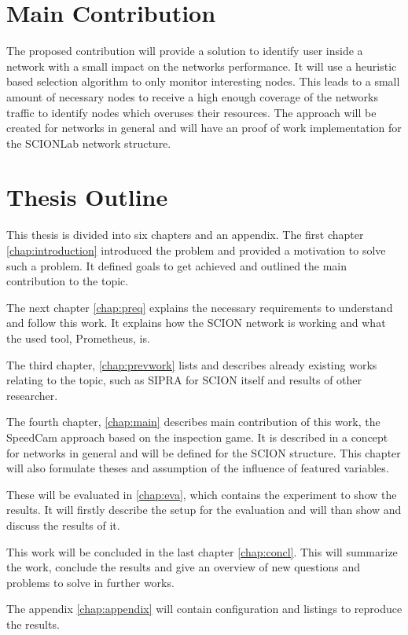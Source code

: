 \documentclass[thesis.tex]{subfiles}
\begin{document}
\section{Main Contribution}
The proposed contribution will provide a solution to identify user inside a network with a small impact on the networks performance. It will use a heuristic based selection algorithm to only monitor interesting nodes. This leads to a small amount of necessary nodes to receive a high enough coverage of the networks traffic to identify nodes which overuses their resources. The approach will be created for networks in general and will have an proof of work implementation for the SCIONLab network structure.

\section{Thesis Outline}
This thesis is divided into six chapters and an appendix. The first chapter \autoref{chap:introduction} introduced the problem and provided a motivation to solve such a problem. It defined goals to get achieved and outlined the main contribution to the topic.

The next chapter \autoref{chap:preq} explains the necessary requirements to understand and follow this work. It explains how the SCION network is working and what the used tool, Prometheus, is.

The third chapter, \autoref{chap:prevwork} lists and describes already existing works relating to the topic, such as SIPRA for SCION itself and results of other researcher. 

The fourth chapter, \autoref{chap:main} describes main contribution of this work, the SpeedCam approach based on the inspection game. It is described in a concept for networks in general and will be defined for the SCION structure. This chapter will also formulate theses and assumption of the influence of featured variables.

These will be evaluated in \autoref{chap:eva}, which contains the experiment to show the results. It will firstly describe the setup for the evaluation and will than show and discuss the results of it.

This work will be concluded in the last chapter \autoref{chap:concl}. This will summarize the work, conclude the results and give an overview of new questions and problems to solve in further works.

The appendix \autoref{chap:appendix} will contain configuration and listings to reproduce the results.

\subfilebib %
\end{document}

